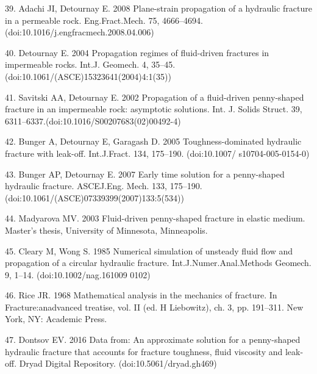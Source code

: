 \documentclass[main.tex]{subfiles}
\begin{document}
39. Adachi JI, Detournay E. 2008 Plane-strain propagation of a hydraulic fracture in a permeable rock. Eng.Fract.Mech. 75, 4666–4694. (doi:10.1016/j.engfracmech.2008.04.006)

40. Detournay E. 2004 Propagation regimes of fluid-driven fractures in impermeable rocks. Int.J. Geomech. 4, 35–45. (doi:10.1061/(ASCE)15323641(2004)4:1(35))

41. Savitski AA, Detournay E. 2002 Propagation of a fluid-driven penny-shaped fracture in an impermeable rock: asymptotic solutions. Int. J. Solids Struct. 39, 6311–6337.\newline (doi:10.1016/S00207683(02)00492-4)

42. Bunger A, Detournay E, Garagash D. 2005 Toughness-dominated hydraulic fracture with leak-off. Int.J.Fract. 134, 175–190. (doi:10.1007/ s10704-005-0154-0)

43. Bunger AP, Detournay E. 2007 Early time solution for a penny-shaped hydraulic fracture. ASCEJ.Eng. Mech. 133, 175–190. (doi:10.1061/(ASCE)07339399(2007)133:5(534))

44. Madyarova MV. 2003 Fluid-driven penny-shaped fracture in elastic medium. Master’s thesis, University of Minnesota, Minneapolis.

45. Cleary M, Wong S. 1985 Numerical simulation of unsteady fluid flow and propagation of a circular hydraulic fracture. Int.J.Numer.Anal.Methods Geomech. 9, 1–14. (doi:10.1002/nag.161009 0102)

46. Rice JR. 1968 Mathematical analysis in the mechanics of fracture. In Fracture:anadvanced treatise, vol. II (ed. H Liebowitz), ch. 3, pp. 191–311. New York, NY: Academic Press.

47. Dontsov EV. 2016 Data from: An approximate solution for a penny-shaped hydraulic fracture that accounts for fracture toughness, fluid viscosity and leak-off. Dryad Digital Repository. (doi:10.5061/dryad.gh469)

\newpage
\setcounter{figure}{0}
\setcounter{subsection}{0}
\setcounter{equation}{0}
\end{document}
